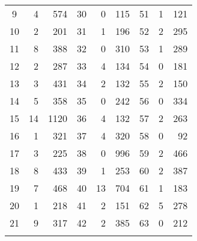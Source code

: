 \documentclass {book}
\begin{document}
\begin{sidebar}
\begin{table}
\begin{tabular}{crr|crr|ccr}
9  \mbox{}&  4  \mbox{} & 574\phantom{*} &\mbox{}  30  \mbox{} &  0  \mbox{} &   115 \mbox{}& \hspace{0.05in}51 &  1  \mbox{} &  121 \\
10 \mbox{}&  2  \mbox{} & 201\phantom{*} &\mbox{}  31  \mbox{} &  1  \mbox{} &   196 \mbox{}& \hspace{0.05in}52 &  2  \mbox{} &  295 \\
11 \mbox{}&  8  \mbox{} & 388\phantom{*} &\mbox{}  32  \mbox{} &  0  \mbox{} &   310 \mbox{}& \hspace{0.05in}53 &  1  \mbox{} &  289 \\
12 \mbox{}&  2  \mbox{} & 287\phantom{*} &\mbox{}  33  \mbox{} &  4  \mbox{} &   134 \mbox{}& \hspace{0.05in}54 &  0  \mbox{} &  181 \\
13 \mbox{}&  3  \mbox{} & 431\phantom{*} &\mbox{}  34  \mbox{} &  2  \mbox{} &   132 \mbox{}& \hspace{0.05in}55 &  2  \mbox{} &  150 \\
14 \mbox{}&  5  \mbox{} & 358\phantom{*} &\mbox{}  35  \mbox{} &  0  \mbox{} &   242 \mbox{}& \hspace{0.05in}56 &  0  \mbox{} &  334 \\
15 \mbox{}& 14  \mbox{} & 1120\phantom{*} &\mbox{} 36  \mbox{} &  4  \mbox{} &   132 \mbox{}& \hspace{0.05in}57 &  2  \mbox{} &  263 \\
16 \mbox{}&  1  \mbox{} & 321\phantom{*} &\mbox{}  37  \mbox{} &  4  \mbox{} &   320 \mbox{}& \hspace{0.05in}58 &  0  \mbox{} &  92 \\
17 \mbox{}&  3  \mbox{} & 225\phantom{*} &\mbox{}  38  \mbox{} &  0  \mbox{} &   996 \mbox{}& \hspace{0.05in}59 &  2  \mbox{} &  466 \\
18 \mbox{}&  8  \mbox{} & 433\phantom{*} &\mbox{}  39  \mbox{} &  1  \mbox{} &   253 \mbox{}& \hspace{0.05in}60 &  2  \mbox{} &  387 \\
19 \mbox{}&  7  \mbox{} & 468\phantom{*} &\mbox{}  40  \mbox{} & 13  \mbox{} &   704 \mbox{}& \hspace{0.05in}61 &  1  \mbox{} &  183 \\
20 \mbox{}&  1  \mbox{} & 218\phantom{*} &\mbox{}  41  \mbox{} &  2  \mbox{} &   151 \mbox{}& \hspace{0.05in}62 &  5  \mbox{} &  278 \\
21 \mbox{}&  9  \mbox{} & 317\phantom{*} &\mbox{}  42  \mbox{} &  2  \mbox{} &   385 \mbox{}& \hspace{0.05in}63 &  0  \mbox{} &  212\\
\noalign{\smallskip}\hline
\end{tabular}
\end{table}


\end{sidebar}
\end{document}

